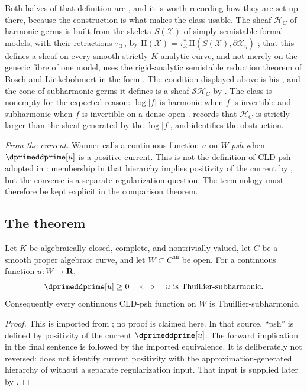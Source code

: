 Both halves of that definition are \cite{Thu05}, and it is worth recording
how they are set up there, because the construction is what makes the class
usable.  The sheaf $\mathcal H_C$ of harmonic germs is built from the
skeleta $S(\mathcal X)$ of simply semistable formal models, with their
retractions $\tau_{\mathcal X}$, by
$\mathrm H(\mathcal X)=\tau_{\mathcal X}^{*}\mathrm H(S(\mathcal
X),\partial\mathcal X_\eta)$
\cite[Def.~2.3.1, Def.~2.3.12, Def.~2.3.16]{Thu05}; that this defines a sheaf
on every smooth strictly $K$-analytic curve, and not merely on the
generic fibre of one model, uses the rigid-analytic semistable reduction
theorem of Bosch and L\"utkebohmert in the form \cite[Thm.~2.3.8]{Thu05}.
The condition displayed above is his \cite[Def.~3.1.5]{Thu05}, and the cone
of subharmonic germs it defines is a sheaf $\mathcal{SH}_C$ by
\cite[Cor.~3.1.13]{Thu05}.  The class is nonempty for the expected reason:
$\log|f|$ is harmonic when $f$ is invertible \cite[Prop.~2.3.20]{Thu05}
and subharmonic when $f$ is invertible on a dense open
\cite[Prop.~3.1.6]{Thu05}.   records that
$\mathcal H_C$ is strictly larger than the sheaf generated by the
$\log|f|$, and identifies the obstruction.

\emph{From the current.}  Wanner calls a continuous function $u$ on $W$
\emph{psh} when $\dprimeddprime[u]$ is a positive current.  This is not the
definition of CLD-psh adopted in : membership in
that hierarchy implies positivity of the current by
, but the converse is a separate
regularization question.  The terminology must therefore be kept explicit
in the comparison theorem.

\subsection{The theorem}
\label{sec:ch19-wanner-theorem}

\begin{theorem}\label{thm:wanner-curve-comparison}
Let $K$ be algebraically closed, complete, and nontrivially valued, let
$C$ be a smooth proper algebraic curve, and let $W\subset C^{\mathrm{an}}$
be open.  For a continuous function $u:W\to\mathbf R$,
\[
                  \dprimeddprime[u]\geq0
        \quad\Longleftrightarrow\quad
                  u\text{ is Thuillier-subharmonic}.
\]
Consequently every continuous CLD-psh function on $W$ is
Thuillier-subharmonic.
\end{theorem}
\begin{proof}
This is imported from \cite[Theorem~4.7 and Corollary~4.8]{Wanner19}; no
proof is claimed here.  In that source, ``psh'' is defined by positivity of
the current $\dprimeddprime[u]$.  The forward implication in the final
sentence is  followed by the imported
equivalence.  It is deliberately not reversed: \cite{Wanner19} does not
identify current positivity with the approximation-generated hierarchy of
 without a separate regularization input.  That
input is supplied later by
.
\end{proof}


